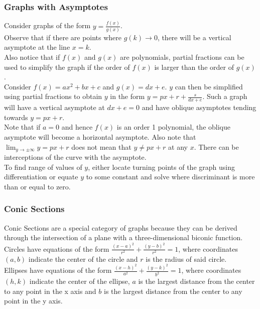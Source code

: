 \documentclass[../main]{subfiles}
\begin{document}
	\subsubsection{Graphs with Asymptotes}

	Consider graphs of the form \(y = \frac{f(x)}{g(x)}\). \\

	Observe that if there are points where \(g(k) \rightarrow 0\), there will be a vertical asymptote at the line \(x=k\). \\

	Also notice that if \(f(x)\) and \(g(x)\) are polynomials, partial fractions can be used to simplify the graph if the order of \(f(x)\) is larger than the order of \(g(x)\). \\

	Consider \(f(x) = ax^2 + bx + c\) and \(g(x) = dx + e\). \(y\) can then be simplified using partial fractions to obtain \(y\) in the form \(y = px + r + \frac{s}{dx+e}\). Such a graph will have a vertical asymptote at \(dx+e=0\) and have oblique asymptotes tending towards \(y = px + r\). \\

	Note that if \(a=0\) and hence \(f(x)\) is an order 1 polynomial, the oblique asymptote will become a horizontal asymptote. Also note that \(\lim_{y\to\pm\infty} y = px+r\) does not mean that \(y \neq px + r\) at any \(x\). There can be interceptions of the curve with the asymptote. \\

	To find range of values of \(y\), either locate turning points of the graph using differentiation or equate \(y\) to some constant and solve where discriminant is more than or equal to zero.

	\subsubsection{Conic Sections}

	Conic Sections are a special category of graphs because they can be derived through the intersection of a plane with a three-dimensional biconic function. \\

	Circles have equations of the form \( \frac{(x-a)^2}{r^2} + \frac{(y-b)^2}{r^2} = 1 \), where coordinates \((a,b)\) indicate the center of the circle and \(r\) is the radius of said circle. \\

	Ellipses have equations of the form  \( \frac{(x-h)^2}{a^2} + \frac{(y-k)^2}{b^2} = 1 \), where coordinates \((h,k)\) indicate the center of the ellipse, \(a\) is the largest distance from the center to any point in the x axis and \(b\) is the largest distance from the center to any point in the y axis. \\
\end{document}
